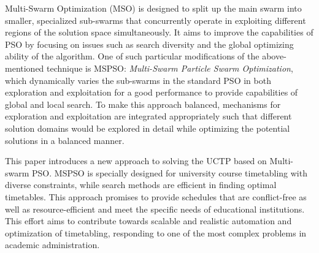 Multi-Swarm Optimization (MSO) is designed to split up the main swarm into smaller, specialized sub-swarms that concurrently operate in exploiting different regions of the solution space simultaneously. \cite{Bacanin2022-multiswarm} \cite{MultiSwarm2004} It aims to improve the capabilities of PSO by focusing on issues such as search diversity and the global optimizing ability of the algorithm. \cite{XIA2018126} One of such particular modifications of the above-mentioned technique is MSPSO: \textit{Multi-Swarm Particle Swarm Optimization}, which dynamically varies the sub-swarms in the standard PSO in both exploration and exploitation for a good performance to provide capabilities of global and local search. \cite{MultiSwarm2004} \cite{Blackwell2006-ms} \cite{XIA2018126} To make this approach balanced, mechanisms for exploration and exploitation are integrated appropriately such that different solution domains would be explored in detail while optimizing the potential solutions in a balanced manner. \cite{Wang2023-ps} 

This paper introduces a new approach to solving the UCTP based on Multi-swarm PSO. MSPSO is specially designed for university course timetabling with diverse constraints, while search methods are efficient in finding optimal timetables. This approach promises to provide schedules that are conflict-free as well as resource-efficient and meet the specific needs of educational institutions. This effort aims to contribute towards scalable and realistic automation and optimization of timetabling, responding to one of the most complex problems in academic administration.

